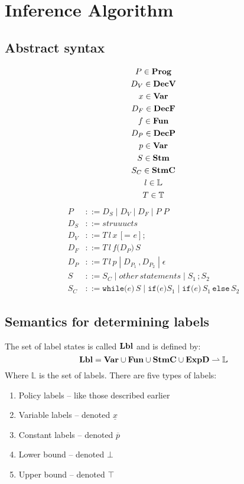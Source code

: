 
\section{Inference Algorithm}

\subsection{Abstract syntax}

\newcommand{\gp}{\; | \;} %

\begin{gather*}
  P \in \mathbf{Prog}\\
  D_V \in \mathbf{DecV}\\
  x \in \mathbf{Var}\\
  D_F \in \mathbf{DecF} \\
  f \in \mathbf{Fun}\\
  D_P \in \mathbf{DecP}\\
  p \in \mathbf{Var}\\
  S \in \mathbf{Stm}\\
  S_C \in \mathbf{StmC}\\
  l \in \mathbb{L}\\
  T \in \mathbb{T}\\
\end{gather*}
\begin{align*}
  P       & ::= D_S \gp D_V \gp D_F \gp P \; P\\
  D_S     & ::= struuucts\\
  D_V     & ::= T \, l \, x \, [\texttt{= } e] \texttt{;}\\
  D_F     & ::= T \, l \, f \texttt{(} D_P \texttt{)} \, S\\
  D_P     & ::= T \, l \, p \gp D_{P_1} \, \texttt{,} \, D_{P_2} \gp \epsilon\\
  S       & ::= S_C \gp other \, statements \gp S_1 \, \texttt{;} \, S_2\\
  S_C     & ::= \texttt{while(} e \texttt{)} \, S \gp \texttt{if(} e \texttt{)} S_1 \gp \texttt{if(} e \texttt{)} \, S_1 \, \texttt{else} \, S_2
\end{align*}

\subsection{Semantics for determining labels}
The set of label states is called $\mathbf{Lbl}$ and is defined by:
\[
  \mathbf{Lbl} = \mathbf{Var} \cup \mathbf{Fun} \cup \mathbf{StmC} \cup \mathbf{ExpD} \rightharpoonup \mathbb{L}
\]
Where $\mathbb{L}$ is the set of labels.
There are five types of labels:
\begin{enumerate}
  \item Policy labels -- like those described earlier
  \item Variable labels -- denoted $\underline{x}$
  \item Constant labels -- denoted $\overline{p}$
  \item Lower bound -- denoted $\bot$
  \item Upper bound -- denoted $\top$
\end{enumerate}

